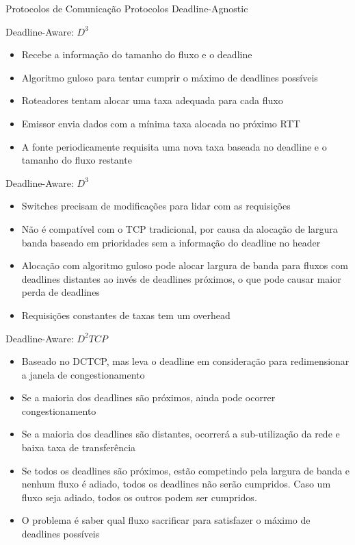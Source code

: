 \documentclass[aspectratio=169]{beamer}
\begin{document}
	\begin{frame} {Protocolos de Comunicação}
		Protocolos Deadline-Agnostic
	\end{frame}

	\begin{frame} {Deadline-Aware: $D^3$}
		\begin{itemize}
		 	\item
		 		Recebe a informação do tamanho do fluxo e o deadline
		 	\item
				Algoritmo guloso para tentar cumprir o máximo de deadlines possíveis
		 	\item
				Roteadores tentam alocar uma taxa adequada para cada fluxo
		 	\item
				Emissor envia dados com a mínima taxa alocada no próximo RTT
		 	\item
				A fonte periodicamente requisita uma nova taxa baseada no deadline e o tamanho do fluxo restante
		 \end{itemize}
	\end{frame}

	\begin{frame} {Deadline-Aware: $D^3$}
		\begin{itemize}
		 	\item
		 		Switches precisam de modificações para lidar com as requisições
		 	\item
				Não é compatível com o TCP tradicional, por causa da alocação de largura banda baseado em prioridades sem a informação do deadline no header
		 	\item
				Alocação com algoritmo guloso pode alocar largura de banda para fluxos com deadlines distantes ao invés de deadlines próximos, o que pode causar maior perda de deadlines
		 	\item
				Requisições constantes de taxas tem um overhead
		 \end{itemize}
	\end{frame}

	\begin{frame} {Deadline-Aware: $D^2TCP$}
		\begin{itemize}
		 	\item
		 		Baseado no DCTCP, mas leva o deadline em consideração para redimensionar a janela de congestionamento
		 	\item
				Se a maioria dos deadlines são próximos, ainda pode ocorrer congestionamento
		 	\item
				Se a maioria dos deadlines são distantes, ocorrerá a sub-utilização da rede e baixa taxa de transferência
		 	\item
				Se todos os deadlines são próximos, estão competindo pela largura de banda e nenhum fluxo é adiado, todos os deadlines não serão cumpridos. Caso um fluxo seja adiado, todos os outros podem ser cumpridos.
		 	\item
				O problema é saber qual fluxo sacrificar para satisfazer o máximo de deadlines possíveis
		 \end{itemize}
	\end{frame}
\end{document}
